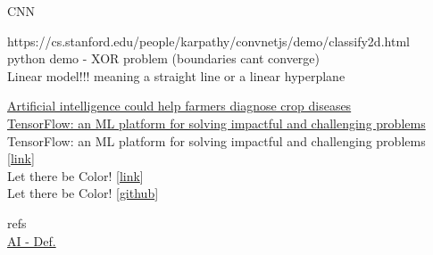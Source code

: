 \documentclass[10pt, compress]{beamer}
\begin{document}
\begin{frame}
  CNN
\end{frame}

\begin{frame}
  https://cs.stanford.edu/people/karpathy/convnetjs/demo/classify2d.html \\
  python demo - XOR problem (boundaries cant converge) \\
  Linear model!!! meaning a straight line or a linear hyperplane
\end{frame}

\begin{frame}
\href{https://news.psu.edu/story/429727/2016/10/04/research/artificial-intelligence-could-help-farmers-diagnose-crop-diseases}{Artificial intelligence could help farmers diagnose crop diseases} \\
%
\href{https://www.youtube.com/watch?v=NlpS-DhayQA}{TensorFlow: an ML platform for solving impactful and challenging problems} \\

TensorFlow: an ML platform for solving impactful and challenging problems [\href{https://www.youtube.com/watch?v=NlpS-DhayQA}{link}] \\

Let there be Color! [\href{http://iizuka.cs.tsukuba.ac.jp/projects/colorization/extra.html}{link}] \\

Let there be Color! [\href{https://github.com/satoshiiizuka/siggraph2016_colorization}{github}]

refs \\
\href{https://www.sciencedaily.com/terms/artificial_intelligence.htm}{AI - Def.}


\end{frame}
\end{document}
